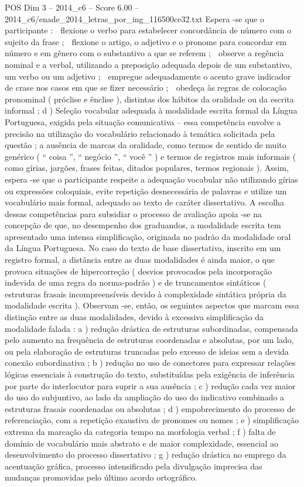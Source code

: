 \begin{textsample}{POS Dim 3 – 2014\_c6 – Score 6.00 – 2014\_c6/enade\_2014\_letras\_por\_ing\_116500ce32.txt}
Espera -se que o participante :  flexione o verbo para estabelecer concordância de número com o sujeito da frase ;  flexione o artigo, o adjetivo e o pronome para concordar em número e em gênero com o substantivo a que se referem ;  observe a regência nominal e a verbal, utilizando a preposição adequada depois de um substantivo, um verbo ou um adjetivo ;  empregue adequadamente o acento grave indicador de crase nos casos em que se fizer necessário ;  obedeça às regras de colocação pronominal ( próclise e ênclise ), distintas dos hábitos da oralidade ou da escrita informal ; d ) Seleção vocabular adequada à modalidade escrita formal da Língua Portuguesa, exigida pela situação comunicativa – essa competência envolve a precisão na utilização do vocabulário relacionado à temática solicitada pela questão ; a ausência de marcas da oralidade, como termos de sentido de muito genérico ( “ coisa ”, “ negócio ”, “ você ” ) e termos de registros mais informais ( como gírias, jargões, frases feitas, ditados populares, termos regionais ).
Assim, espera -se que o participante respeite a adequação vocabular não utilizando gírias ou expressões coloquiais, evite repetição desnecessária de palavras e utilize um vocabulário mais formal, adequado ao texto de caráter dissertativo.
A escolha dessas competências para subsidiar o processo de avaliação apoia -se na concepção de que, no desempenho dos graduandos, a modalidade escrita tem apresentado uma intensa simplificação, originada no padrão da modalidade oral da Língua Portuguesa.
No caso do texto de base dissertativa, inscrito em um registro formal, a distância entre as duas modalidades é ainda maior, o que provoca situações de hipercorreção ( desvios provocados pela incorporação indevida de uma regra da norma-padrão ) e de truncamentos sintáticos ( estruturas frasais incompreensíveis devido à complexidade sintática própria da modalidade escrita ).
Observam -se, então, os seguintes aspectos que marcam essa distinção entre as duas modalidades, devido à excessiva simplificação da modalidade falada : a ) redução drástica de estruturas subordinadas, compensada pelo aumento na frequência de estruturas coordenadas e absolutas, por um lado, ou pela elaboração de estruturas truncadas pelo excesso de ideias sem a devida conexão subordinativa ; b ) redução no uso de conectores para expressar relações lógicas essenciais à construção do texto, substituídas pela exigência de inferência por parte do interlocutor para suprir a sua ausência ; c ) redução cada vez maior do uso do subjuntivo, ao lado da ampliação do uso do indicativo combinado a estruturas frasais coordenadas ou absolutas ; d ) empobrecimento do processo de referenciação, com a repetição exaustiva de pronomes ou nomes ; e ) simplificação extrema da marcação da categoria tempo na morfologia verbal ; f ) falta de domínio de vocabulário mais abstrato e de maior complexidade, essencial ao desenvolvimento do processo dissertativo ; g ) redução drástica no emprego da acentuação gráfica, processo intensificado pela divulgação imprecisa das mudanças promovidas pelo último acordo ortográfico.

\end{textsample}
